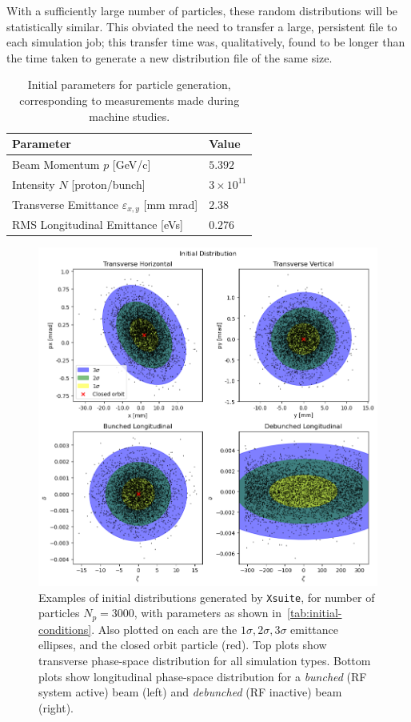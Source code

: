 \documentclass[a4paper,twoside,11pt]{report}
\begin{document}
With a sufficiently large number of particles, these random distributions will be statistically similar. This obviated the need to transfer a large, persistent file to each simulation job; this transfer time was, qualitatively, found to be longer than the time taken to generate a new distribution file of the same size.

\begin{table}[]
  \centering
  \begin{tabular}{ll}
    \centering
  Parameter                                       & Value \\ \hline \hline
  Beam Momentum $p$ [GeV/c]                       & $5.392$ \\
  Intensity $N$ [proton/bunch]                    & $3\times10^{11}$ \\
  Transverse Emittance $\varepsilon_{x,y}$ [mm mrad]  & $2.38$ \\
  RMS Longitudinal Emittance [eVs]                & $0.276$
  \end{tabular}
  \caption[Initial particle generation parameters]{Initial parameters for particle generation, corresponding to measurements made during machine studies.}\label{tab:initial-conditions}
\end{table}

\begin{figure}
  \centering
  \includegraphics*[width=\linewidth]{initial-dist.png}
  \cprotect\caption[Initial particle distributions generated by \verb|Xsuite|]{Examples of initial distributions generated by \verb|Xsuite|, for number of particles $N_p=3000$, with parameters as shown in~\autoref{tab:initial-conditions}. Also plotted on each are the $1\sigma, 2\sigma, 3\sigma$ emittance ellipses, and the closed orbit particle (red). Top plots show transverse phase-space distribution for all simulation types. Bottom plots show longitudinal phase-space distribution for a \textit{bunched} (RF system active) beam (left) and \textit{debunched} (RF inactive) beam (right).}\label{fig:initial-dist}
\end{figure}
\end{document}
